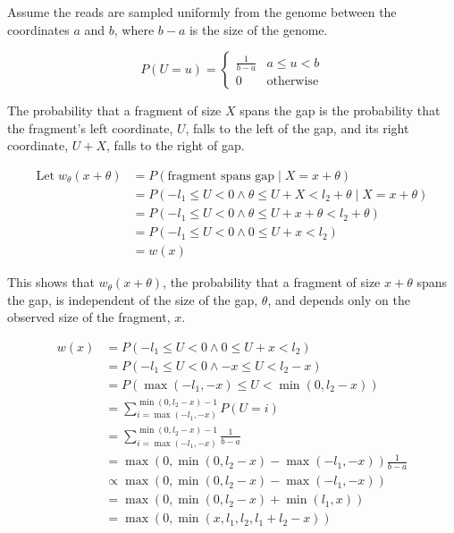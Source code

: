 \documentclass[letterpaper,12pt]{article}
\begin{document}
Assume the reads are sampled uniformly from the genome between the
coordinates $a$ and $b$, where $b - a$ is the size of the genome.

\begin{equation*}
P(U=u) = \begin{cases}
\frac{1}{b-a} & a \leq u < b \\
0 & \text{otherwise}
\end{cases}
\end{equation*}

The probability that a fragment of size $X$ spans the gap is the
probability that the fragment's left coordinate, $U$, falls to the
left of the gap, and its right coordinate, $U+X$, falls to the right
of gap.

\begin{align*}
\text{Let}\; w_\theta(x + \theta)
&=P(\text{fragment spans gap} \mid X=x+\theta) \\
&=P(-l_1 \leq U < 0 \wedge \theta \leq U + X < l_2 + \theta \mid X=x+\theta) \\
&= P(-l_1 \leq U < 0 \wedge \theta \leq U + x + \theta < l_2 + \theta) \\
&= P(-l_1 \leq U < 0 \wedge 0 \leq U + x < l_2) \\
&= w(x)
\end{align*}

This shows that $w_\theta(x+\theta)$, the probability that a fragment
of size $x+\theta$ spans the gap, is independent of the size of the
gap, $\theta$, and depends only on the observed size of the fragment,
$x$.

\begin{align*}
w(x)
&= P(-l_1 \leq U < 0 \wedge 0 \leq U + x < l_2) \\
&= P(-l_1 \leq U < 0 \wedge -x \leq U < l_2 - x) \\
&= P(\max(-l_1, -x) \leq U < \min(0, l_2 - x)) \\
&= \sum_{i=\max(-l_1, -x)}^{\min(0, l_2 - x) - 1} P(U=i) \\
&= \sum_{i=\max(-l_1, -x)}^{\min(0, l_2 - x) - 1} \frac{1}{b-a} \\
&= \max(0, \min(0, l_2 - x) - \max(-l_1, -x)) \frac{1}{b-a} \\
&\propto \max(0, \min(0, l_2 - x) - \max(-l_1, -x)) \\
&= \max(0, \min(0, l_2 - x) + \min(l_1, x)) \\
&= \max(0, \min(x, l_1, l_2, l_1 + l_2 - x))
\end{align*}
\end{document}
